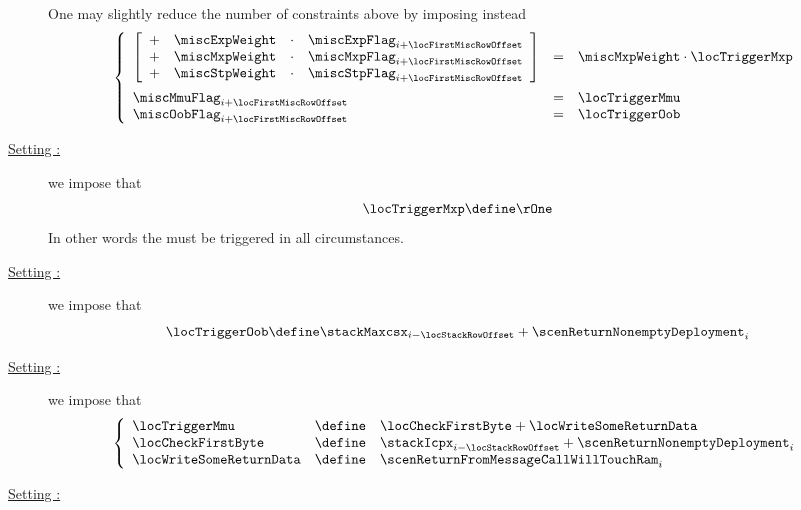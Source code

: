 \begin{description}
		\saNote{} \label{hub: instruction handling: halt: return: generalities: optimized misc flags}
		One may slightly reduce the number of constraints above by imposing instead
		\[
			\left\{ \begin{array}{lcl}
				\left[ \begin{array}{clcl}
					+ & \miscExpWeight & \cdot & \miscExpFlag _{i + \locFirstMiscRowOffset} \\
					+ & \miscMxpWeight & \cdot & \miscMxpFlag _{i + \locFirstMiscRowOffset} \\
					+ & \miscStpWeight & \cdot & \miscStpFlag _{i + \locFirstMiscRowOffset} \\
				\end{array} \right]
				& = & \miscMxpWeight \cdot \locTriggerMxp \vspace{2mm} \\
				\miscMmuFlag  _{i + \locFirstMiscRowOffset} & = & \locTriggerMmu \\
				\miscOobFlag  _{i + \locFirstMiscRowOffset} & = & \locTriggerOob \\
			\end{array} \right.
		\]
	\item[\underline{Setting \locTriggerMxp:}]
		we impose that
		\[
			\locTriggerMxp \define \rOne
		\]
		\saNote{} In other words the \mxpMod{} must be triggered in all circumstances.
	\item[\underline{Setting \locTriggerOob:}]
		we impose that
		\[
			\locTriggerOob \define \stackMaxcsx _{i - \locStackRowOffset} + \scenReturnNonemptyDeployment _{i}
		\]
	\item[\underline{Setting \locTriggerMmu:}]
		we impose that
		\[
			\left\{ \begin{array}{lcl}
				\locTriggerMmu          & \define & \locCheckFirstByte + \locWriteSomeReturnData             \\
				\locCheckFirstByte      & \define & \stackIcpx _{i - \locStackRowOffset} + \scenReturnNonemptyDeployment _{i} \\
				\locWriteSomeReturnData & \define & \scenReturnFromMessageCallWillTouchRam _{i}              \\
			\end{array} \right.
		\]
	\item[\underline{Setting \locTriggerHashInfo{}:}]

\end{description}
